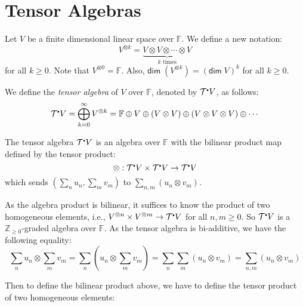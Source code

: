 \documentclass[
	11pt, %
	fleqn, %
	a4paper, %
]{LegrandOrangeBook}
\newcommand{\smallbullet}{\scalebox{0.5}{$\bullet$}}
\newcommand{\F}{\mathbb{F}} %
\newcommand{\T}{\mathcal{T}^{\smallbullet}} %
\newcommand{\Z}{\mathbb{Z}} %
\renewcommand{\dim}{\mathsf{dim\;}} %
\begin{document}
\newpage

\section{Tensor Algebras}

Let $V$ be a finite dimensional linear space over $\F$. We define a new notation:
\[
    V^{\otimes k} = \underbrace{V \otimes V \otimes \cdots \otimes V}_{k \text{ times}}
\]
for all $k \geq 0$. Note that $V^{\otimes 0} = \F$. Also, $\dim(V^{\otimes k}) = (\dim{V})^k$ for all $k \geq 0$.

We define the \emph{tensor algebra} of $V$ over $\F$, denoted by $\T V$, as follows:
\[
    \T V = \bigoplus_{k = 0}^{\infty} V^{\otimes k} = \F \oplus V \oplus (V \otimes V) \oplus (V \otimes V \otimes V) \oplus \cdots
\]

The tensor algebra $\T V$ is an algebra over $\F$ with the bilinear product map defined by the tensor product:
\[
    \otimes : \T V \times \T V \to \T V
\]
which sends $(\sum_n u_n, \sum_m v_m)$ to $\sum_{n, m} (u_n \otimes v_m)$.
\begin{remark}
    As the algebra product is bilinear, it suffices to know the product of two homogeneous elements, i.e., $V^{\otimes n} \times V^{\otimes m} \to \T V$ for all $n, m \geq 0$. So $\T V$ is a $\Z_{\geq 0}$-graded algebra over $\F$. As the tensor algebra is bi-additive, we have the following equality:
    \[
        \sum_n u_n \otimes \sum_m v_m = \sum_n (u_n \otimes \sum_m v_m) = \sum_n \sum_m (u_n \otimes v_m) = \sum_{n, m} (u_n \otimes v_m)
    \]
\end{remark}

Then to define the bilinear product above, we have to define the tensor product of two homogeneous elements:
\begin{center}
\end{center}
\end{document}
